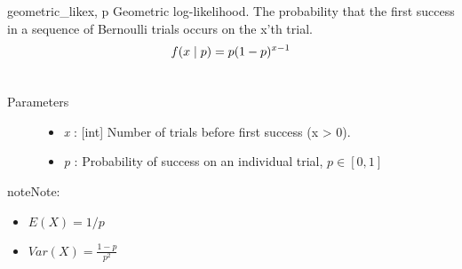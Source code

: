 \hypertarget{pymc.distributions.geometric_like}{}\begin{funcdesc}{geometric\_like}{x, p}
Geometric log-likelihood. The probability that the first success in a
sequence of Bernoulli trials occurs on the x'th trial.
\begin{gather}
\begin{split}f(x \mid p) = p(1-p)^{x-1}\end{split}\notag\\\begin{split}\end{split}\notag
\end{gather}\begin{description}
\item[Parameters] \leavevmode\begin{itemize}
\item {} 
\emph{x} : {[}int{]} Number of trials before first success (x \textgreater{} 0).

\item {} 
\emph{p} : Probability of success on an individual trial, $p \in [0,1]$

\end{itemize}

\end{description}

\begin{notice}{note}{Note:}\begin{itemize}
\item {} 
$E(X)=1/p$

\item {} 
$Var(X)=\frac{1-p}{p^2}$

\end{itemize}
\end{notice}
\end{funcdesc}


